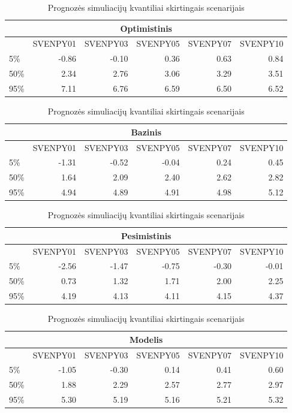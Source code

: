 \documentclass[12pt,lithuanian,]{article}
\begin{document}
\begin{table}
\caption{\label{table:yc_forecast}Prognozės simuliacijų kvantiliai skirtingais scenarijais}

\centering
\begin{tabular}[t]{l|r|r|r|r|r}
\hline
\multicolumn{6}{c}{\textbf{Optimistinis}}\\
\hline
  & SVENPY01 & SVENPY03 & SVENPY05 & SVENPY07 & SVENPY10\\
\hline
5\% & -0.86 & -0.10 & 0.36 & 0.63 & 0.84\\
\hline
50\% & 2.34 & 2.76 & 3.06 & 3.29 & 3.51\\
\hline
95\% & 7.11 & 6.76 & 6.59 & 6.50 & 6.52\\
\hline
\end{tabular}
\centering
\begin{tabular}[t]{l|r|r|r|r|r}
\hline
\multicolumn{6}{c}{\textbf{Bazinis}}\\
\hline
  & SVENPY01 & SVENPY03 & SVENPY05 & SVENPY07 & SVENPY10\\
\hline
5\% & -1.31 & -0.52 & -0.04 & 0.24 & 0.45\\
\hline
50\% & 1.64 & 2.09 & 2.40 & 2.62 & 2.82\\
\hline
95\% & 4.94 & 4.89 & 4.91 & 4.98 & 5.12\\
\hline
\end{tabular}
\centering
\begin{tabular}[t]{l|r|r|r|r|r}
\hline
\multicolumn{6}{c}{\textbf{Pesimistinis}}\\
\hline
  & SVENPY01 & SVENPY03 & SVENPY05 & SVENPY07 & SVENPY10\\
\hline
5\% & -2.56 & -1.47 & -0.75 & -0.30 & -0.01\\
\hline
50\% & 0.73 & 1.32 & 1.71 & 2.00 & 2.25\\
\hline
95\% & 4.19 & 4.13 & 4.11 & 4.15 & 4.37\\
\hline
\end{tabular}
\centering
\begin{tabular}[t]{l|r|r|r|r|r}
\hline
\multicolumn{6}{c}{\textbf{Modelis}}\\
\hline
  & SVENPY01 & SVENPY03 & SVENPY05 & SVENPY07 & SVENPY10\\
\hline
5\% & -1.05 & -0.30 & 0.14 & 0.41 & 0.60\\
\hline
50\% & 1.88 & 2.29 & 2.57 & 2.77 & 2.97\\
\hline
95\% & 5.30 & 5.19 & 5.16 & 5.21 & 5.32\\
\hline
\end{tabular}
\end{table}
\end{document}
